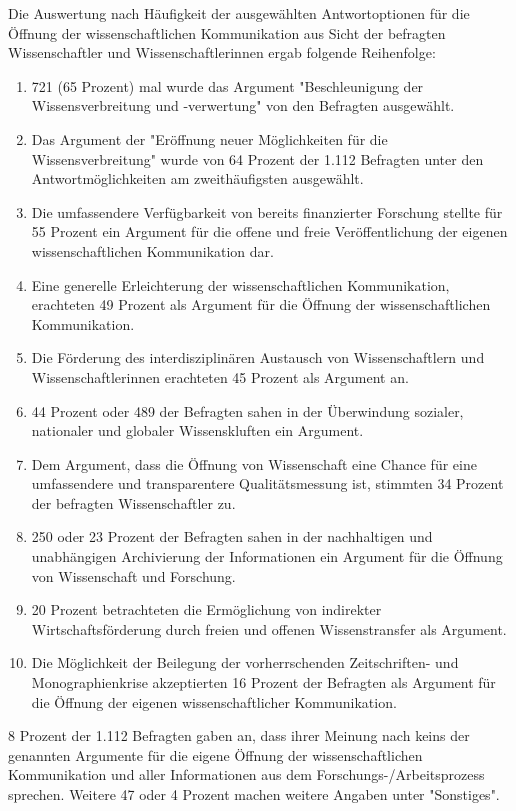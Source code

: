 Die Auswertung nach Häufigkeit der ausgewählten Antwortoptionen für die Öffnung der wissenschaftlichen Kommunikation aus Sicht der befragten Wissenschaftler und Wissenschaftlerinnen ergab folgende Reihenfolge:
\begin{enumerate}
\item 721 (65 Prozent) mal wurde das Argument "Beschleunigung der Wissensverbreitung und -verwertung" von den Befragten ausgewählt.
\item Das Argument der "Eröffnung neuer Möglichkeiten für die Wissensverbreitung" wurde von 64 Prozent der 1.112 Befragten unter den Antwortmöglichkeiten am zweithäufigsten ausgewählt.
\item Die umfassendere Verfügbarkeit von bereits finanzierter Forschung stellte für 55 Prozent ein Argument für die offene und freie Veröffentlichung der eigenen wissenschaftlichen Kommunikation dar.
\item Eine generelle Erleichterung der wissenschaftlichen Kommunikation, erachteten 49 Prozent als Argument für die Öffnung der wissenschaftlichen Kommunikation.
\item Die Förderung des interdisziplinären Austausch von Wissenschaftlern und Wissenschaftlerinnen erachteten 45 Prozent als Argument an.
\item 44 Prozent oder 489 der Befragten sahen in der Überwindung sozialer, nationaler und globaler Wissenskluften ein Argument.
\item Dem Argument, dass die Öffnung von Wissenschaft eine Chance für eine umfassendere und transparentere Qualitätsmessung ist, stimmten 34 Prozent der befragten Wissenschaftler zu.
\item 250 oder 23 Prozent der Befragten sahen in der nachhaltigen und unabhängigen Archivierung der Informationen ein Argument für die Öffnung von Wissenschaft und Forschung.
\item 20 Prozent betrachteten die Ermöglichung von indirekter Wirtschaftsförderung durch freien und offenen Wissenstransfer als Argument.
\item Die Möglichkeit der Beilegung der vorherrschenden Zeitschriften- und Monographienkrise akzeptierten 16 Prozent der Befragten als Argument für die Öffnung der eigenen wissenschaftlicher Kommunikation.
\end{enumerate}

8 Prozent der 1.112 Befragten gaben an, dass ihrer Meinung nach keins der genannten Argumente für die eigene Öffnung der wissenschaftlichen Kommunikation und aller Informationen aus dem Forschungs-/Arbeitsprozess sprechen. Weitere 47 oder 4 Prozent machen weitere Angaben unter "Sonstiges".

